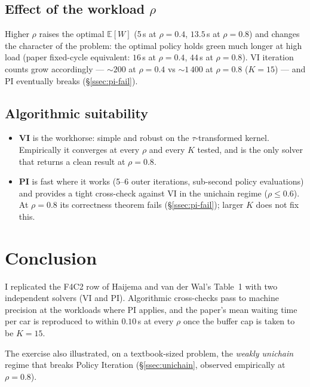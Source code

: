 \documentclass[11pt,a4paper]{article}
\newcommand{\E}{\mathbb{E}}
\begin{document}
\subsection{Effect of the workload $\rho$}

Higher $\rho$ raises the optimal $\E[W]$ (5\,s at $\rho = 0.4$,
$13.5$\,s at $\rho = 0.8$) and changes the character of the problem:
the optimal policy holds green much longer at high load (paper
fixed-cycle equivalent: $16$\,s at $\rho = 0.4$, $44$\,s at
$\rho = 0.8$). VI iteration counts grow accordingly --- $\sim 200$ at
$\rho = 0.4$ vs $\sim 1\,400$ at $\rho = 0.8$ ($K = 15$) --- and PI
eventually breaks (\S\ref{ssec:pi-fail}).

\subsection{Algorithmic suitability}

\begin{itemize}[leftmargin=*]
    \item \textbf{VI} is the workhorse: simple and robust on the
        $\tau$-transformed kernel. Empirically it converges at every
        $\rho$ and every $K$ tested, and is the only solver that
        returns a clean result at $\rho = 0.8$.
    \item \textbf{PI} is fast where it works (5--6 outer iterations,
        sub-second policy evaluations) and provides a tight
        cross-check against VI in the unichain regime
        ($\rho \le 0.6$). At $\rho = 0.8$ its correctness theorem
        fails (\S\ref{ssec:pi-fail}); larger $K$ does not fix this.
\end{itemize}

\section{Conclusion}
\label{sec:conc}

I replicated the F4C2 row of Haijema and van der Wal's Table~1 with
two independent solvers (VI and PI). Algorithmic cross-checks pass to
machine precision at the workloads where PI applies, and the paper's
mean waiting time per car is reproduced to within $0.10$\,s at every
$\rho$ once the buffer cap is taken to be $K = 15$.

The exercise also illustrated, on a textbook-sized problem, the
\emph{weakly unichain} regime that breaks Policy Iteration
(\S\ref{ssec:unichain}, observed empirically at $\rho = 0.8$).
\end{document}
